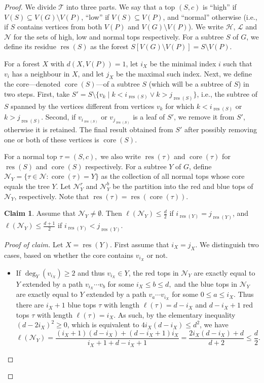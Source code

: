 \documentclass[11pt]{article}
\theoremstyle{definition}
\newtheorem{claim}[thr]{Claim}
\newcommand{\res}{\operatorname{res}}
\newcommand{\core}{\operatorname{core}}
\newcommand{\ny}{\mathcal N_{Y}}
\newenvironment{poc}{\begin{proof}[Proof of claim]\renewcommand*{\qedsymbol}{$\blacksquare$}}{\end{proof}}
\begin{document}
\begin{proof}
    We divide $\mathcal T$ into three parts. We say that a top $(S,c)$ is ``high'' if $V(S) \subseteq V(G)\setminus V(P)$, ``low'' if $V(S) \subseteq V(P)$, and ``normal'' otherwise (i.e., if $S$ contains vertices from both $V(P)$ and $V(G)\setminus V(P)$). We write $\mathcal{H}$, $\mathcal{L}$ and $\mathcal{N}$ for the sets of high, low and normal tops respectively. 
    For a subtree $S$ of $G$, we define its residue $\res(S)$ as the forest $S[V(G) \setminus V(P)]=S \setminus V(P).$
    
    For a forest $X$ with $d(X,V(P))=1$, let $i_X$ be the minimal index $i$ such that $v_i$ has a neighbour in $X$, and let $j_X$ be the maximal such index. 
    Next, we define the core---denoted $\core(S)$---of a subtree $S$ (which will be a subtree of $S$) in two steps.
    First, take $S'=S \setminus \{v_k \mid k < i_{\res(S)} \vee k > j_{\res(S)} \}$, i.e., the subtree of $S$ spanned by the vertices different from vertices $v_k$ for which $k < i_{\res(S)}$ or $ k > j_{\res(S)}.$
    Second, if $v_{i_{\res(S)}}$ or $v_{j_{\res(S)}}$ is a leaf of $S'$, we remove it from $S'$, otherwise it is retained. The final result obtained from $S'$ after possibly removing one or both of these vertices is $\core(S)$.

    For a normal top $\tau=(S,c),$ we also write $\res(\tau)$ and $\core(\tau)$ for $\res(S)$ and $\core(S)$ respectively.
    For a subtree $Y$ of $G$, define $\ny=\{ \tau \in \mathcal N \colon \core(\tau)=Y\}$ as the collection of all normal tops whose core equals the tree $Y$.
    Let $\ny^r$ and $\ny^b$ be the partition into the red and blue tops of $\ny$, respectively.
    Note that $\res(\tau)=\res(\core(\tau)).$ 

    \begin{claim}\label{clm:ell_ny}
        Assume that $\ny \neq \emptyset$. Then $\ell(\ny) \le \frac{d}{2} $ if $i_{\res(Y)}=j_{\res(Y)}$, and $\ell(\ny) \le \frac{d+1}{2} $ if $i_{\res(Y)}<j_{\res(Y)}.$
    \end{claim}
    \begin{poc}
        Let $X=\res(Y).$
        First assume that $i_X=j_X.$
        We distinguish two cases, based on whether the core contains $v_{i_X}$ or not.
        \begin{itemize}
            \item If $\deg_Y(v_{i_X})\ge 2$ and thus $v_{i_X} \in Y$, the red tops in $\ny$ are exactly equal to $Y$ extended by a path $v_{i_X}\cdots v_b$ for some $i_X \le b \le d,$ and the blue tops in $\ny$ are exactly equal to $Y$ extended by a path $v_a \cdots v_{i_X}$ for some $0 \le a \le i_X.$
            Thus there are $i_X+1$ blue tops $\tau$ with length $\ell(\tau) = d-i_X$ and $d-i_X+1$ red tops $\tau$ with length $\ell(\tau) = i_X.$
            As such, by the elementary inequality $(d-2i_X)^2 \ge 0$, which is equivalent to $4i_X(d-i_X)\le d^2$, we have
            $$\ell(\ny)=\frac{ (i_X+1)(d-i_X)+(d-i_X+1)i_X}{i_X+1+d-i_X+1} = \frac{2i_X(d-i_X) +d}{d+2} \le \frac{ d}{2}. $$


\end{itemize}
\end{poc}
\end{proof}
\end{document}
